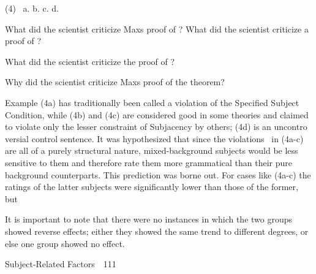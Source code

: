 \begin{multicols}{2}
\begin{styleStandard}
(4) \ a. b. c. d.
\end{styleStandard}


\begin{styleStandard}
What did the scientist criticize Max{\textquotesingle}s proof of ? What did the scientist criticize a proof of ?
\end{styleStandard}


\begin{styleStandard}
What did the scientist criticize the proof of ?
\end{styleStandard}


\begin{styleStandard}
Why did the scientist criticize Max{\textquotesingle}s proof of the theorem?
\end{styleStandard}


\end{multicols}
\begin{styleStandard}
Example (4a) has traditionally been called a violation of the Specified Subject Condition, while (4b) and (4c) are considered good in some theories and claimed to violate only the lesser constraint of Subjacency by others; (4d) is an uncontro\- versial control sentence. It was hypothesized that since the violations \ in (4a-c) are all of a purely structural nature, mixed-background subjects would be less sensitive to them and therefore rate them more grammatical than their pure\- background counterparts. This prediction was borne out. For cases like (4a-c) the ratings of the latter subjects were significantly lower than those of the former, but
\end{styleStandard}


\begin{listWWNumxlileveli}
\item 
\setcounter{listWWNumxlilevelii}{10}
\begin{listWWNumxlilevelii}
\item 
\begin{styleStandard}
It is important to note that there were no instances in which the two groups showed reverse effects; either they showed the same trend to different degrees, or else one group showed no effect.
\end{styleStandard}


\end{listWWNumxlilevelii}
\end{listWWNumxlileveli}
\clearpage\setcounter{page}{1}\begin{styleStandard}
Subject-Related Factors\ \ 111
\end{styleStandard}


